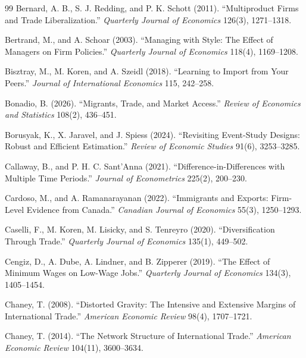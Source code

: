 \documentclass[12pt]{article}
\theoremstyle{remark}
\begin{document}
\begin{thebibliography}{99}
Bernard, A. B., S. J. Redding, and P. K. Schott (2011). ``Multiproduct Firms and Trade Liberalization.'' \textit{Quarterly Journal of Economics} 126(3), 1271--1318.

Bertrand, M., and A. Schoar (2003). ``Managing with Style: The Effect of Managers on Firm Policies.'' \textit{Quarterly Journal of Economics} 118(4), 1169--1208.

Bisztray, M., M. Koren, and A. Szeidl (2018). ``Learning to Import from Your Peers.'' \textit{Journal of International Economics} 115, 242--258.

Bonadio, B. (2026). ``Migrants, Trade, and Market Access.'' \textit{Review of Economics and Statistics} 108(2), 436--451.

Borusyak, K., X. Jaravel, and J. Spiess (2024). ``Revisiting Event-Study Designs: Robust and Efficient Estimation.'' \textit{Review of Economic Studies} 91(6), 3253--3285.

Callaway, B., and P. H. C. Sant'Anna (2021). ``Difference-in-Differences with Multiple Time Periods.'' \textit{Journal of Econometrics} 225(2), 200--230.

Cardoso, M., and A. Ramanarayanan (2022). ``Immigrants and Exports: Firm-Level Evidence from Canada.'' \textit{Canadian Journal of Economics} 55(3), 1250--1293.

Caselli, F., M. Koren, M. Lisicky, and S. Tenreyro (2020). ``Diversification Through Trade.'' \textit{Quarterly Journal of Economics} 135(1), 449--502.

Cengiz, D., A. Dube, A. Lindner, and B. Zipperer (2019). ``The Effect of Minimum Wages on Low-Wage Jobs.'' \textit{Quarterly Journal of Economics} 134(3), 1405--1454.

Chaney, T. (2008). ``Distorted Gravity: The Intensive and Extensive Margins of International Trade.'' \textit{American Economic Review} 98(4), 1707--1721.

Chaney, T. (2014). ``The Network Structure of International Trade.'' \textit{American Economic Review} 104(11), 3600--3634.


\end{thebibliography}
\end{document}
